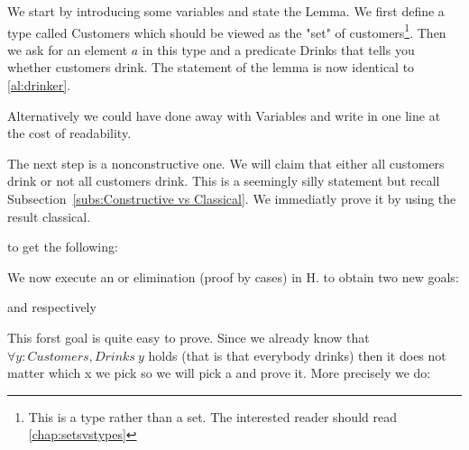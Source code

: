 We start by introducing some variables and state the Lemma. We  first define a type called Customers which should be viewed as the "set" of customers\footnote{This is a type rather than a set. The interested reader should read \ref{chap:setsvstypes}}. Then we ask for an element $a$ in this type and a predicate Drinks that tells you whether customers drink. The statement of the lemma is now identical to \ref{al:drinker}.




Alternatively we could have done away with Variables and write in one line at the cost of readability.


The next step is a nonconstructive one. We will claim that either all customers drink or not all customers drink. This is a seemingly silly statement but recall Subsection~\ref{subs:Constructive vs Classical}. We immediatly prove it by using the result classical.


to get the following:



We now execute an or elimination (proof by cases) in H.
to obtain two new goals:




and respectively


This forst goal is quite easy to prove. Since we already know that $\forall y : Customers, Drinks\  y$ holds (that is that everybody drinks) then it does not matter which x we pick so we will pick a and prove it. More precisely we do:

